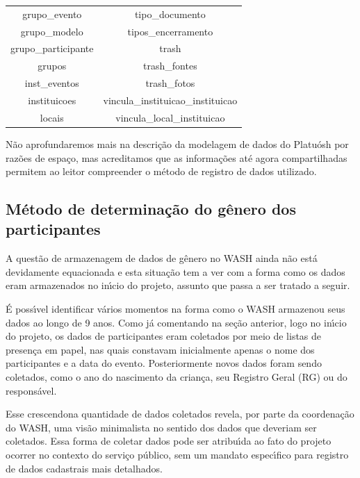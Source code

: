 \documentclass[
12pt,		%
openright,	%
twoside,  %
a4paper,			%
chapter=TITLE,		%
english,			%
french,				%
spanish,			%
brazil				%
]{USPSC-classe/USPSC}
\begin{document}
\begin{table}[htb]
\begin{tabular}{|c|c|}
 grupo\_evento                   &   tipo\_documento \\
 grupo\_modelo                   &   tipos\_encerramento \\
 grupo\_participante             &   trash \\
 grupos                         &   trash\_fontes \\
 inst\_eventos                   &   trash\_fotos \\
 instituicoes                   &   vincula\_instituicao\_instituicao \\
 locais                         &   vincula\_local\_instituicao \\
\hline
\end{tabular}
\end{table}


N\~ao aprofundaremos mais na descri\c{c}\~ao da modelagem de dados do Platu\'osh por raz\~oes de espa\c{c}o, mas acreditamos que as informa\c{c}\~oes at\'e agora compartilhadas permitem ao leitor compreender o m\'etodo de registro de dados utilizado.


\subsection[M\'etodo de determina\c{c}\~ao do g\^enero dos participantes]{M\'etodo de determina\c{c}\~ao do g\^enero dos participantes}\label{M\'etodo de determina\c{c}\~ao do g\^enero dos participantes}
A quest\~ao de armazenagem de dados de g\^enero no WASH ainda n\~ao est\'a devidamente equacionada e esta situa\c{c}\~ao tem a ver com a forma como os dados eram armazenados no in\'{\i}cio do projeto, assunto que passa a ser tratado a seguir.


\'E poss\'{\i}vel identificar v\'arios momentos na forma como o WASH armazenou seus dados ao longo de 9 anos. Como j\'a comentando na se\c{c}\~ao anterior, logo no in\'{\i}cio do projeto, os dados de participantes eram coletados por meio de listas de presen\c{c}a em papel, nas quais constavam inicialmente apenas o nome dos participantes e a data do evento. Posteriormente novos dados foram sendo coletados, como o ano do nascimento da crian\c{c}a, seu Registro Geral (RG) ou do respons\'avel.


Esse \textquotedbl crescendo\textquotedbl  na quantidade de dados coletados revela, por parte da coordena\c{c}\~ao do WASH, uma vis\~ao minimalista no sentido dos dados que deveriam ser coletados. Essa forma de coletar dados pode ser atribu\'{\i}da ao fato do projeto ocorrer no contexto do servi\c{c}o p\'ublico, sem um mandato espec\'{\i}fico para registro de dados cadastrais mais detalhados.
\end{document}
